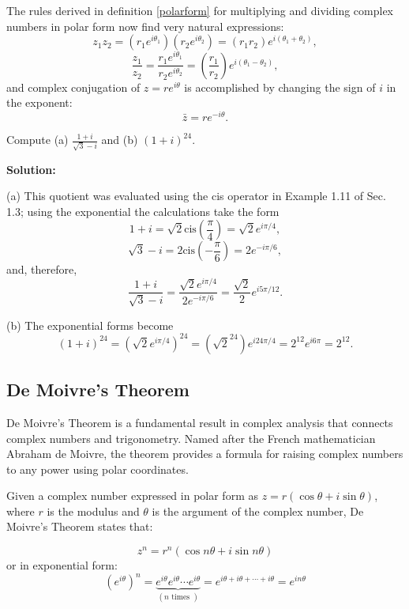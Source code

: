 The rules derived in definition \ref{polarform} for multiplying and dividing complex numbers in polar form now find very natural expressions:
\begin{equation}
    z_1z_2 = (r_1e^{i\theta_1})(r_2e^{i\theta_2}) = (r_1r_2)e^{i(\theta_1+\theta_2)},
\end{equation}
\begin{equation}
    \frac{z_1}{z_2} = \frac{r_1e^{i\theta_1}}{r_2e^{i\theta_2}} = \left(\frac{r_1}{r_2}\right)e^{i(\theta_1-\theta_2)},
\end{equation}
and complex conjugation of \( z = re^{i\theta} \) is accomplished by changing the sign of \( i \) in the exponent:
\begin{equation}
    \bar{z} = re^{-i\theta}.
\end{equation}

\begin{example}
    Compute (a) \( \frac{1 + i}{\sqrt{3} - i} \) and (b) \( (1 + i)^{24} \).
\end{example}
\textbf{Solution:}


(a) This quotient was evaluated using the cis operator in Example 1.11 of Sec. 1.3; using the exponential the calculations take the form
\[
1 + i = \sqrt{2} \text{cis} \left(\frac{\pi}{4}\right) = \sqrt{2}e^{i\pi/4},
\]
\[
\sqrt{3} - i = 2 \text{cis} \left(-\frac{\pi}{6}\right) = 2e^{-i\pi/6},
\]
and, therefore,
\[
\frac{1 + i}{\sqrt{3} - i} = \frac{\sqrt{2}e^{i\pi/4}}{2e^{-i\pi/6}} = \frac{\sqrt{2}}{2} e^{i5\pi/12}.
\]

(b) The exponential forms become
\[
(1 + i)^{24} = \left(\sqrt{2}e^{i\pi/4}\right)^{24} = \left(\sqrt{2}^{24}\right)e^{i24\pi/4} = 2^{12} e^{i6\pi} = 2^{12}.
\]
\subsection{De Moivre's Theorem}
De Moivre's Theorem is a fundamental result in complex analysis that connects complex numbers and trigonometry. Named after the French mathematician Abraham de Moivre, the theorem provides a formula for raising complex numbers to any power using polar coordinates.

Given a complex number expressed in polar form as \( z = r(\cos \theta + i\sin \theta) \), where \( r \) is the modulus and \( \theta \) is the argument of the complex number, De Moivre's Theorem states that:
\begin{theorem}
    \begin{equation}
        z^n = r^n (\cos n\theta + i\sin n\theta)
    \end{equation}
    or in exponential form:
    \begin{equation}
        \left(e^{i \theta}\right)^{n}=\underbrace{e^{i \theta} e^{i \theta} \cdots e^{i \theta}}_{(n \text { times })}=e^{i \theta+i \theta+\cdots+i \theta}=e^{i n \theta}
    \end{equation}
\end{theorem}


